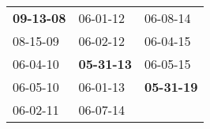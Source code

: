 \begin{supertabular}{p{0.33\columnwidth}p{0.33\columnwidth}p{0.33\columnwidth}}
 \textbf{09-13-08\textsuperscript{}} &           06-01-12\textsuperscript{} &           06-08-14\textsuperscript{} \\
          08-15-09\textsuperscript{} &           06-02-12\textsuperscript{} &           06-04-15\textsuperscript{} \\
          06-04-10\textsuperscript{} &  \textbf{05-31-13\textsuperscript{}} &           06-05-15\textsuperscript{} \\
          06-05-10\textsuperscript{} &           06-01-13\textsuperscript{} &  \textbf{05-31-19\textsuperscript{}} \\
          06-02-11\textsuperscript{} &           06-07-14\textsuperscript{} &                                      \\
\end{supertabular}
